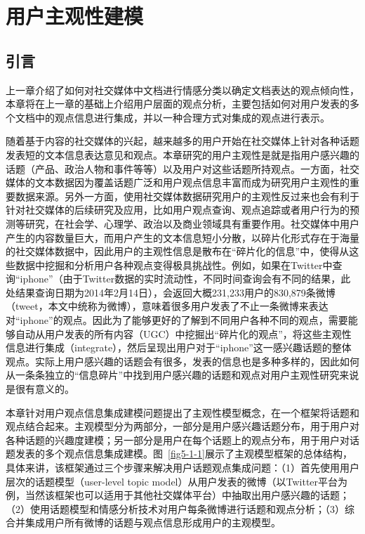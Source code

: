 \chapter{用户主观性建模}
\label{ch5}

\section{引言}
上一章介绍了如何对社交媒体中文档进行情感分类以确定文档表达的观点倾向性，本章将在上一章的基础上介绍用户层面的观点分析，主要包括如何对用户发表的多个文档中的观点信息进行集成，并以一种合理方式对集成的观点进行表示。

随着基于内容的社交媒体的兴起，越来越多的用户开始在社交媒体上针对各种话题发表短的文本信息表达意见和观点。本章研究的用户主观性是就是指用户感兴趣的话题（产品、政治人物和事件等等）以及用户对这些话题所持观点。一方面，社交媒体的文本数据因为覆盖话题广泛和用户观点信息丰富而成为研究用户主观性的重要数据来源。另外一方面，使用社交媒体数据研究用户的主观性反过来也会有利于针对社交媒体的后续研究及应用，比如用户观点查询、观点追踪或者用户行为的预测等研究，在社会学、心理学、政治以及商业领域具有重要作用。社交媒体中用户产生的内容数量巨大，而用户产生的文本信息短小分散，以碎片化形式存在于海量的社交媒体数据中，因此用户的主观性信息是散布在“碎片化的信息”中，使得从这些数据中挖掘和分析用户各种观点变得极具挑战性。例如，如果在Twitter中查询“iphone”（由于Twitter数据的实时流动性，不同时间查询会有不同的结果，此处结果查询日期为2014年2月14日），会返回大概231,233用户的830,879条微博（tweet，本文中统称为微博），意味着很多用户发表了不止一条微博来表达对“iphone”的观点。因此为了能够更好的了解到不同用户各种不同的观点，需要能够自动从用户发表的所有内容（UGC）中挖掘出“碎片化的观点”，将这些主观性信息进行集成（integrate），然后呈现出用户对于“iphone”这一感兴趣话题的整体观点。实际上用户感兴趣的话题会有很多，发表的信息也是多种多样的，因此如何从一条条独立的“信息碎片”中找到用户感兴趣的话题和观点对用户主观性研究来说是很有意义的。

本章针对用户观点信息集成建模问题提出了主观性模型概念，在一个框架将话题和观点结合起来。主观模型分为两部分，一部分是用户感兴趣话题分布，用于用户对各种话题的兴趣度建模；另一部分是用户在每个话题上的观点分布，用于用户对话题发表的多个观点信息集成建模。图~\ref{fig5-1-1}展示了主观模型框架的总体结构，具体来讲，该框架通过三个步骤来解决用户话题观点集成问题：（1）首先使用用户层次的话题模型（user-level topic model）从用户发表的微博（以Twitter平台为例，当然该框架也可以适用于其他社交媒体平台）中抽取出用户感兴趣的话题；（2）使用话题模型和情感分析技术对用户每条微博进行话题和观点分析；（3）综合并集成用户所有微博的话题与观点信息形成用户的主观模型。

